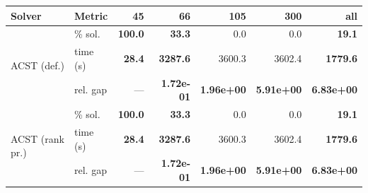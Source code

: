 \begin{tabular}{llrrrrr}
\toprule
 Solver & Metric & 45 & 66 & 105 & 300 & all \\
\midrule
\multirow{3}{*}{ACST (def.)} & \% sol. & \textbf{100.0} & \textbf{33.3} & 0.0 & 0.0 & \textbf{19.1} \\
  & time (s) & \textbf{28.4} & \textbf{3287.6} & 3600.3 & 3602.4 & \textbf{1779.6} \\
  & rel. gap & --- & \textbf{1.72e-01} & \textbf{1.96e+00} & \textbf{5.91e+00} & \textbf{6.83e+00} \\
\midrule
\multirow{3}{*}{ACST (rank pr.)} & \% sol. & \textbf{100.0} & \textbf{33.3} & 0.0 & 0.0 & \textbf{19.1} \\
  & time (s) & \textbf{28.4} & \textbf{3287.6} & 3600.3 & 3602.4 & \textbf{1779.6} \\
  & rel. gap & --- & \textbf{1.72e-01} & \textbf{1.96e+00} & \textbf{5.91e+00} & \textbf{6.83e+00} \\
\bottomrule
\end{tabular}
